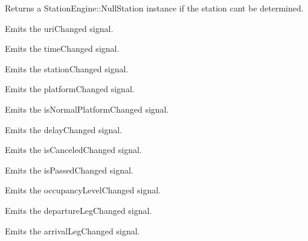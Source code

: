 Returns a Station\+Engine\+::\+Null\+Station instance if the station can\textquotesingle{}t be determined.

Emits the uri\+Changed signal.

Emits the time\+Changed signal.

Emits the station\+Changed signal.

Emits the platform\+Changed signal.

Emits the is\+Normal\+Platform\+Changed signal.

Emits the delay\+Changed signal.

Emits the is\+Canceled\+Changed signal.

Emits the is\+Passed\+Changed signal.

Emits the occupancy\+Level\+Changed signal.

Emits the departure\+Leg\+Changed signal.

Emits the arrival\+Leg\+Changed signal. 